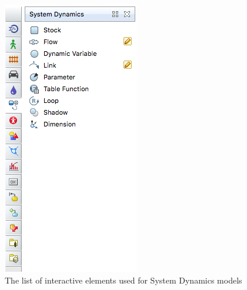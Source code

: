 \begin{figure}[H]
  \centering
  \includegraphics[height=0.5\textwidth]{img/screens/basic/basic22}
  \caption{The list of interactive elements used for System Dynamics models}
\end{figure}

